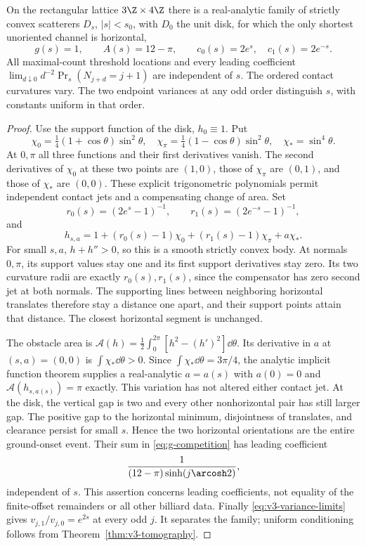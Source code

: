 \begin{theorem}
\label{thm:v3-fibers}
On the rectangular lattice $3\Z\times4\Z$ there is a real-analytic family
of strictly convex scatterers $D_s$, $|s|<s_0$, with $D_0$ the unit
disk, for which the only shortest unoriented channel is horizontal,
\[
 g(s)=1,\qquad A(s)=12-\pi,\qquad
 c_0(s)=2e^s,\quad c_1(s)=2e^{-s}.
\]
All maximal-count threshold locations and every leading coefficient
$\lim_{d\downarrow0}d^{-2}\Pr_s(N_{j+d}=j+1)$ are independent of $s$.
The ordered contact curvatures vary. The two endpoint variances at any
odd order distinguish $s$, with constants uniform in that order.
\end{theorem}
\begin{proof}
Use the support function of the disk, $h_0\equiv1$. Put
\[
 \chi_0=\tfrac14(1+\cos\theta)\sin^2\theta,\quad
 \chi_\pi=\tfrac14(1-\cos\theta)\sin^2\theta,\quad
 \chi_*=\sin^4\theta.
\]
At $0,\pi$ all three functions and their first derivatives vanish.
The second derivatives of $\chi_0$ at these two points are $(1,0)$,
those of $\chi_\pi$ are $(0,1)$, and those of $\chi_*$ are $(0,0)$.
These explicit trigonometric polynomials permit independent contact
jets and a compensating change of area. Set
\[
 r_0(s)=(2e^s-1)^{-1},\qquad r_1(s)=(2e^{-s}-1)^{-1},
\]
and
\[
 h_{s,a}=1+(r_0(s)-1)\chi_0+(r_1(s)-1)\chi_\pi+a\chi_*.
\]
For small $s,a$, $h+h''>0$, so this is a smooth strictly convex body.
At normals $0,\pi$, its support values stay one and its first
support derivatives stay zero. Its two curvature radii are exactly
$r_0(s),r_1(s)$, since the compensator has zero second jet at both normals.
The supporting lines between neighboring horizontal translates
therefore stay a distance one apart, and their support points attain
that distance. The closest horizontal segment is unchanged.

The obstacle area is
$\mathcal A(h)=\frac12\int_0^{2\pi}[h^2-(h')^2]\dd\theta$.
Its derivative in $a$ at $(s,a)=(0,0)$ is $\int\chi_*\dd\theta>0$.
Since $\int\chi_*\dd\theta=3\pi/4$, the analytic implicit function
theorem supplies a real-analytic $a=a(s)$ with
$a(0)=0$ and $\mathcal A(h_{s,a(s)})=\pi$ exactly. This variation
has not altered either contact jet. At the disk, the vertical gap is
two and every other nonhorizontal pair has still larger gap. The
positive gap to the horizontal minimum, disjointness of translates,
and clearance persist for small $s$. Hence the two horizontal
orientations are the entire ground-onset event. Their sum in
\eqref{eq:g-competition} has leading coefficient
\[
       \frac1{(12-\pi)\sinh(j\arcosh2)},
\]
independent of $s$. This assertion concerns leading coefficients,
not equality of the finite-offset remainders or all other billiard data.
Finally \eqref{eq:v3-variance-limits} gives
$v_{j,1}/v_{j,0}=e^{2s}$ at every odd $j$. It separates the family;
uniform conditioning follows from Theorem~\ref{thm:v3-tomography}.
\end{proof}

